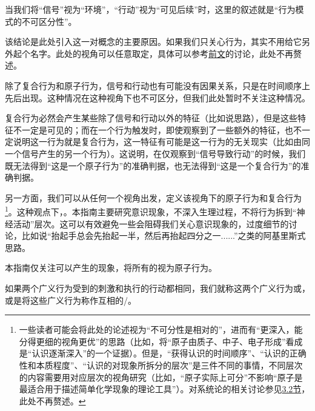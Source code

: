 \begin{explain}
当我们将“信号”视为“环境”，“行动”视为“可见后续”时，这里的叙述就是“行为模式的不可区分性”。

该结论是此处引入这一对概念的主要原因。如果我们只关心行为，其实不用给它另外起个名字。此处的视角可以任意取定，具体可以参考\hyperref[def:视角]{前文}的讨论，此处不再赘述。

除了复合行为和原子行为，信号和行动也有可能没有因果关系，只是在时间顺序上先后出现。这种情况在这种视角下也不可区分，但我们此处暂时不关注这种情况。

复合行为必然会产生某些除了信号和行动以外的特征（比如说思路），但是这些特征不一定是可见的；而在一个行为触发时，即使观察到了一些额外的特征，也不一定说明这一行为就是复合行为，这一特征有可能是这一行为的无关现实（比如由同一个信号产生的另一个行为）。这说明，在仅观察到“信号导致行动”的时候，我们既无法得到“这是一个原子行为”的准确判据，也无法得到“这是一个复合行为”的准确判据。

另一方面，我们可以从任何一个视角出发，定义该视角下的原子行为和复合行为\footnote{一些读者可能会将此处的论述视为“不可分性是相对的”，进而有“更深入，能分得更细的视角更优”的思路（比如，将“原子由质子、中子、电子形成”看成是“认识逐渐深入”的一个证据）。但是，“获得认识的时间顺序”、“认识的正确性和本质程度”、“认识的对现象所拆分的层次”是三件不同的事情，不同层次的内容需要用对应层次的视角研究（比如，“原子实际上可分”不影响“原子是最适合用于描述简单化学现象的理论工具”）。对系统论的相关讨论参见\hyperref[sec:复杂系统]{3.2节}，此处不再赘述。}。这种观点下，。本指南主要研究意识现象，不深入生理过程，不将行为拆到“神经活动”层次。这可以有效避免一些会阻碍我们关心意识现象的，过度细节的讨论，比如说“抬起手总会先抬起一半，然后再抬起四分之一......”之类的阿基里斯式思路。

本指南仅关注可以产生的现象，将所有的视为原子行为。
\end{explain}
如果两个广义行为受到的刺激和执行的行动都相同，我们就称这两个广义行为或，或是将这些广义行为称作互相的/。
